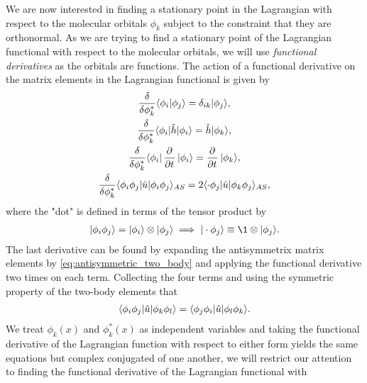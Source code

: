             We are now interested in finding a stationary point in the Lagrangian
            with respect to the molecular orbitals $\phi_k$ subject to the
            constraint that they are orthonormal.
            As we are trying to find a stationary point of the Lagrangian functional
            with respect to the molecular orbitals, we will use \emph{functional
            derivatives} as the orbitals are functions.
            The action of a functional derivative on the matrix elements in the
            Lagrangian functional is given by
            \begin{gather}
                \dfd{\phi_k^{*}}\braket{\phi_i}{\phi_j}
                = \delta_{ik}\ket{\phi_j}, \\
                \dfd{\phi_k^{*}}\bra{\phi_i}\hat{h}\ket{\phi_i}
                = \hat{h}\ket{\phi_k}, \\
                \dfd{\phi_k^{*}}\bra{\phi_i}\dpd{}{t}\ket{\phi_i}
                = \dpd{}{t}\ket{\phi_k}, \\
                \dfd{\phi_k^{*}}\bra{\phi_i\phi_j}\hat{u}\ket{\phi_i\phi_j}_{AS}
                = 2\bra{\cdot\phi_j}\hat{u}\ket{\phi_k\phi_j}_{AS},
            \end{gather}
            where the "dot" is defined in terms of the tensor product by
            \begin{align}
                \ket{\phi_i\phi_j} = \ket{\phi_i}\otimes\ket{\phi_j}
                \implies \ket{\cdot\phi_j} \equiv \1 \otimes\ket{\phi_j}.
            \end{align}
            The last derivative can be found by expanding the antisymmetrix matrix
            elements by \autoref{eq:antisymmetric_two_body} and applying the
            functional derivative two times on each term. Collecting the four terms
            and using the symmetric property of the two-body elements that
            \begin{align}
                \langle \phi_i\phi_j |\hat{u}| \phi_k\phi_l \rangle
                = \langle \phi_j\phi_i |\hat{u}| \phi_l\phi_k \rangle.
            \end{align}
            We treat $\phi_k(x)$ and $\phi_k^{*}(x)$ as independent
            variables and taking the functional derivative of the Lagrangian
            function with respect to either form yields the same equations but
            complex conjugated of one another, we will restrict our attention to
            finding the functional derivative of the Lagrangian functional with
